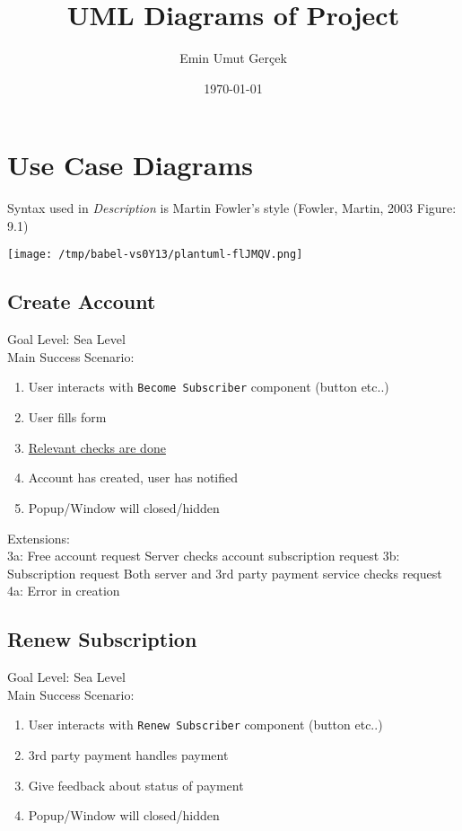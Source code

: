 \documentclass[11pt]{article}
\author{Emin Umut Gerçek}
\date{\today}
\title{UML Diagrams of Project}
\begin{document}
\maketitle
\tableofcontents

\pagebreak

\section{Use Case Diagrams}
\label{sec:org30929df}
Syntax used in \emph{Description} is Martin Fowler's style (Fowler, Martin, 2003 Figure: 9.1)

\begin{center}
\texttt{[image: /tmp/babel-vs0Y13/plantuml-flJMQV.png]}
\end{center}

\subsection{Create Account}
\label{sec:org6dc0c3a}
Goal Level: Sea Level \\
Main Success Scenario: \\

\begin{enumerate}
\item User interacts with \texttt{Become Subscriber} component (button etc..)
\item User fills form
\item \uline{Relevant checks are done}
\item Account has created, user has notified
\item Popup/Window will closed/hidden
\end{enumerate}

Extensions:  \\
3a: Free account request
        Server checks account subscription request
3b: Subscription request
        Both server and 3rd party payment service checks request
4a: Error in creation
\subsection{Renew Subscription}
\label{sec:org2b9f3cf}
Goal Level: Sea Level \\
Main Success Scenario: \\

\begin{enumerate}
\item User interacts with \texttt{Renew Subscriber} component (button etc..)
\item 3rd party payment handles payment
\item Give feedback about status of payment
\item Popup/Window will closed/hidden
\end{enumerate}
\end{document}
